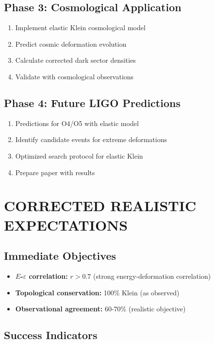 \documentclass[12pt,a4paper]{article}
\begin{document}
\subsection{Phase 3: Cosmological Application}

\begin{enumerate}
\item Implement elastic Klein cosmological model
\item Predict cosmic deformation evolution
\item Calculate corrected dark sector densities
\item Validate with cosmological observations
\end{enumerate}

\subsection{Phase 4: Future LIGO Predictions}

\begin{enumerate}
\item Predictions for O4/O5 with elastic model
\item Identify candidate events for extreme deformations
\item Optimized search protocol for elastic Klein
\item Prepare paper with results
\end{enumerate}

\section{CORRECTED REALISTIC EXPECTATIONS}

\subsection{Immediate Objectives}

\begin{itemize}
\item \textbf{$E$-$\varepsilon$ correlation:} $r > 0.7$ (strong energy-deformation correlation)
\item \textbf{Topological conservation:} 100\% Klein (as observed)
\item \textbf{Observational agreement:} 60-70\% (realistic objective)
\end{itemize}

\subsection{Success Indicators}
\end{document}
